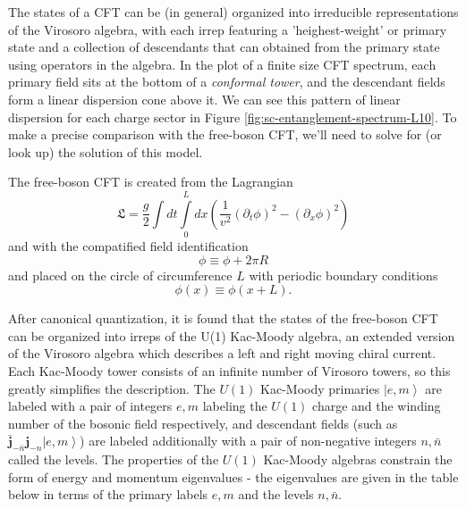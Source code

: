 \documentclass{article}
\newcommand{\ket}[1]{\left |#1 \right \rangle}
\begin{document}
The states of a CFT can be (in general) organized into irreducible representations of the Virosoro algebra, with each irrep featuring a 'heighest-weight' or primary state and a collection of descendants that can obtained from the primary state using operators in the algebra. 
In the plot of a finite size CFT spectrum, each primary field sits at the bottom of a {\em conformal tower}, and the descendant fields form a linear dispersion cone above it. We can see this pattern of linear dispersion for each charge sector in Figure \ref{fig:sc-entanglement-spectrum-L10}.
To make a precise comparison with the free-boson CFT, we'll need to solve for (or look up) the solution of this model.

The free-boson CFT is created from the Lagrangian 
$$ \mathfrak{L} = \frac{g}{2}\int dt \int\limits_0^L dx ( \frac{1}{v^2}(\partial_t \phi)^2 - (\partial_x \phi)^2)$$
and with the compatified field identification
$$ \phi \equiv \phi + 2\pi R$$
and placed on the circle of circumference $L$ with periodic boundary conditions
$$ \phi(x) \equiv \phi(x+L).$$

 
After canonical quantization, it is found that the states of the free-boson CFT can be organized into irreps of the U(1) Kac-Moody algebra, an extended version of the Virosoro algebra which describes a left and right moving chiral current.
Each Kac-Moody tower consists of an infinite number of Virosoro towers, so this greatly simplifies the description. The $U(1)$ Kac-Moody primaries $\ket{e, m}$ are labeled with a pair of integers $e, m$ labeling the $U(1)$ charge and the winding number of the bosonic field respectively, and  descendant fields (such as $\mathbf{\bar{j}}_{-\bar{n}} \mathbf{j}_{-n} \ket{e, m}$) are labeled additionally with a pair of non-negative integers $n, \bar{n}$ called the levels. The properties of the $U(1)$ Kac-Moody algebras constrain the form of energy and momentum eigenvalues - the eigenvalues are given in the table below in terms of the primary labels $e, m$ and the levels $n, \bar{n}$.

\newcommand{\uL}{\mathbf{L_0}}
\newcommand{\bL}{\mathbf{\bar{L}_0}}
\end{document}
